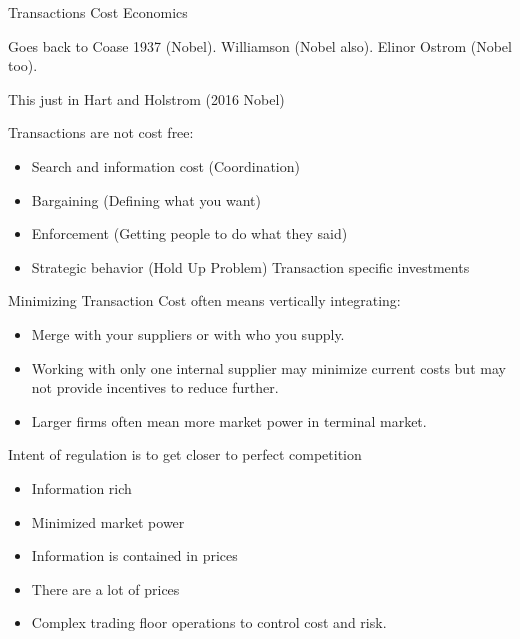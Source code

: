 \documentclass[
  ignorenonframetext,
]{beamer}
\providecommand{\tightlist}{%
  \setlength{\itemsep}{0pt}\setlength{\parskip}{0pt}}
\begin{document}
\begin{frame}{Transactions Cost Economics}
\protect\hypertarget{transactions-cost-economics}{}

Goes back to Coase 1937 (Nobel). Williamson (Nobel also). Elinor Ostrom
(Nobel too).

This just in Hart and Holstrom (2016 Nobel)

Transactions are not cost free:

\begin{itemize}
\tightlist
\item
  Search and information cost (Coordination)
\item
  Bargaining (Defining what you want)
\item
  Enforcement (Getting people to do what they said)
\item
  Strategic behavior (Hold Up Problem) Transaction specific investments
\end{itemize}

Minimizing Transaction Cost often means vertically integrating:

\begin{itemize}
\tightlist
\item
  Merge with your suppliers or with who you supply.
\item
  Working with only one internal supplier may minimize current costs but
  may not provide incentives to reduce further.
\item
  Larger firms often mean more market power in terminal market.
\end{itemize}

\end{frame}

\begin{frame}{Intent of regulation is to get closer to perfect
competition}
\protect\hypertarget{intent-of-regulation-is-to-get-closer-to-perfect-competition}{}

\begin{itemize}
\tightlist
\item
  Information rich
\item
  Minimized market power
\item
  Information is contained in prices
\item
  There are a lot of prices
\item
  Complex trading floor operations to control cost and risk.
\end{itemize}

\end{frame}
\end{document}
